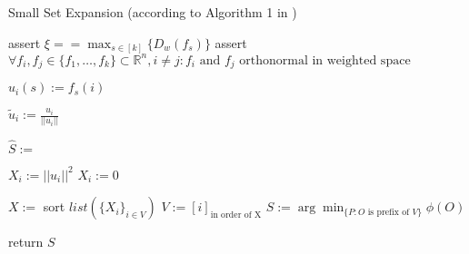 \begin{algorithm}[H]
	\caption{Small Set Expansion (according to Algorithm 1 in \cite{ChanLTZ16}) \label{alg:small_set_expansion}} %
	
	
	\begin{algorithmic}
		\State assert $\xi == \max_{s\in [k]} \{D_w(f_s)\}$
		\State assert $\forall f_i, f_j \in \{f_1, \ldots , f_k\} \subset \mathbb{R}^n, i\neq j: f_i \text{ and } f_j \text{ orthonormal in weighted space} $
		
		\State	$u_i(s) := f_s(i) $
		\EndFor
		\EndFor
		
		\State $\tilde{u}_i := \frac{u_i}{||u_i||}$
		\EndFor
		
		\State $\hat{S} := $ 
		

		\State $X_i := ||u_i||^2$
		\Else
		\State $X_i := 0$
		\EndIf
		
		\EndFor
		\State $X:= $ sort $ list(\{X_i\}_{i \in V})$
		\State $V := [i]_{\text{in order of X}}$
		\State $S := \arg \min_{\{P: O \text{ is prefix of }V\}}\phi(O)$
		
		\State return $S$
		
	
	
		\EndFunction
		
		
	\end{algorithmic}
\end{algorithm} %


